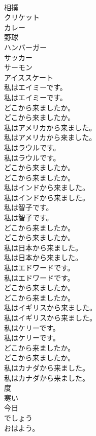 \documentclass[8pt]{extreport}
\begin{document}
\begin{CJK}{UTF8}{min}
\\	相撲
\\	クリケット
\\	カレー
\\	野球
\\	ハンバーガー
\\	サッカー
\\	サーモン
\\	アイススケート
\\	私はエイミーです。	
\\	私はエイミーです。 
\\	どこから来ましたか。	
\\	どこから来ましたか。 
\\	私はアメリカから来ました。	
\\	私はアメリカから来ました。 
\\	私はラウルです。	
\\	私はラウルです。 
\\	どこから来ましたか。	
\\	どこから来ましたか。 
\\	私はインドから来ました。	
\\	私はインドから来ました。 
\\	私は智子です。	
\\	私は智子です。 
\\	どこから来ましたか。	
\\	どこから来ましたか。 
\\	私は日本から来ました。	
\\	私は日本から来ました。 
\\	私はエドワードです。	
\\	私はエドワードです。 
\\	どこから来ましたか。	
\\	どこから来ましたか。 
\\	私はイギリスから来ました。	
\\	私はイギリスから来ました。 
\\	私はケリーです。	
\\	私はケリーです。 
\\	どこから来ましたか。	
\\	どこから来ましたか。 
\\	私はカナダから来ました。	
\\	私はカナダから来ました。 
\\	度
\\	寒い
\\	今日
\\	でしょう
\\	おはよう。	

\end{CJK}
\end{document}
